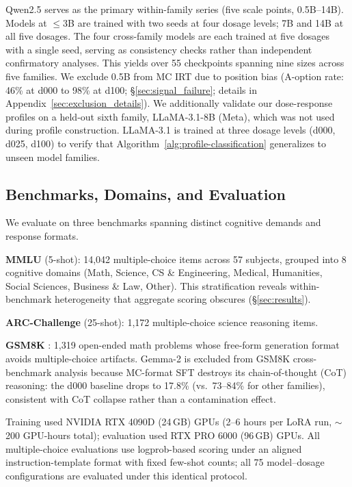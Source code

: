 Qwen2.5 serves as the primary within-family series (five scale points, 0.5B--14B). Models at $\leq$3B are trained with two seeds at four dosage levels; 7B and 14B at all five dosages. The four cross-family models are each trained at five dosages with a single seed, serving as consistency checks rather than independent confirmatory analyses. This yields over 55 checkpoints spanning nine sizes across five families. We exclude 0.5B from MC IRT due to position bias (A-option rate: 46\% at d000 to 98\% at d100; \S\ref{sec:signal_failure}; details in Appendix~\ref{sec:exclusion_details}). We additionally validate our dose-response profiles on a held-out sixth family, LLaMA-3.1-8B \citep{grattafiori2024llama3} (Meta), which was not used during profile construction. LLaMA-3.1 is trained at three dosage levels (d000, d025, d100) to verify that Algorithm~\ref{alg:profile-classification} generalizes to unseen model families.
\subsection{Benchmarks, Domains, and Evaluation}
\label{sec:benchmarks}

We evaluate on three benchmarks spanning distinct cognitive demands and response formats.

\textbf{MMLU} \citep{hendrycks2021mmlu} (5-shot): 14,042 multiple-choice items across 57 subjects, grouped into 8 cognitive domains (Math, Science, CS \& Engineering, Medical, Humanities, Social Sciences, Business \& Law, Other). This stratification reveals within-benchmark heterogeneity that aggregate scoring obscures (\S\ref{sec:results}).

\textbf{ARC-Challenge} \citep{clark2018arc} (25-shot): 1,172 multiple-choice science reasoning items.

\textbf{GSM8K} \citep{cobbe2021gsm8k}: 1,319 open-ended math problems whose free-form generation format avoids multiple-choice artifacts. Gemma-2 is excluded from GSM8K cross-benchmark analysis because MC-format SFT destroys its chain-of-thought (CoT) reasoning: the d000 baseline drops to 17.8\% (vs.\ 73--84\% for other families), consistent with CoT collapse rather than a contamination effect.

Training used NVIDIA RTX 4090D (24\,GB) GPUs (2--6 hours per LoRA run, ${\sim}$200 GPU-hours total); evaluation used RTX PRO 6000 (96\,GB) GPUs. All multiple-choice evaluations use logprob-based scoring under an aligned instruction-template format with fixed few-shot counts; all 75 model--dosage configurations are evaluated under this identical protocol.

